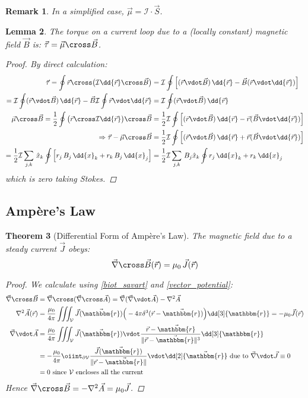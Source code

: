 \documentclass[12pt]{article}
\let\RA\Rightarrow
\renewcommand{\grad}{\vec{\nabla}}
\renewcommand{\div}{\vec{\nabla}\vdot}
\renewcommand{\curl}{\vec{\nabla}\cross}
\newcommand*{\lapl}{\nabla^2}
\newcommand*{\rv}{\vec{r}}
\newcommand*{\ir}{\mathbbm{r}}
\newcommand*{\irv}{\vec{\mathbbm{r}}}
\newcommand*{\vB}{\vec{B}}
\newcommand*{\vJ}{\vec{J}}
\newcommand*{\vA}{\vec{A}}
\newcommand*{\mmu}{\mu_0}
\newcommand*{\vol}{\mathcal{V}}
\newcommand*{\I}{\mathcal{I}}
\newtheorem{theorem}{Theorem}[subsection]
\newtheorem{lemma}[theorem]{Lemma}
\newtheorem{remark}[theorem]{Remark}
\begin{document}
\begin{remark}
  In a simplified case, $\vec{\mu}=\mathcal{I}\cdot\vec{S}$.
\end{remark}

\begin{lemma}
  The torque on a current loop due to a (locally constant) magnetic field $\vec{B}$ is: $\vec{\tau}=\vec{\mu}\cross\vB$.
  \begin{proof}
    By direct calculation: 
    \begin{align*}
      \vec{\tau}=\oint\rv\cross\big(\I\dd{\rv}\cross\vB\big)&=\I\oint\Big[(\rv\vdot\vB)\,\dd{\rv}-\vB(\rv\vdot\dd{\rv})\Big]\\
      =\I\oint(\rv\vdot\vB)\,\dd{\rv}-\vB\I\oint\rv\vdot\dd{\rv}&=\I\oint(\rv\vdot\vB)\,\dd{\rv}\\
      \vec{\mu}\cross\vB=\frac{1}{2}\oint\big(\rv\cross\I\dd{\rv}\big)\cross\vB&=\frac{1}{2}\I\oint\Big[(\rv\vdot\vB)\,\dd{\rv}-\rv(\vB\vdot\dd{\rv})\Big]\\
      \RA\vec{\tau}-\vec{\mu}\cross\vB&=\frac{1}{2}\I\oint\Big[(\rv\vdot\vB)\,\dd{\rv}+\rv(\vB\vdot\dd{\rv})\Big]\\
      =\frac{1}{2}\I\sum_{j,k}\,\hat{x}_k\oint\Big[r_j\,B_j\,\dd{x}_k+r_k\,B_j\,\dd{x}_j\Big]&=\frac{1}{2}\I\sum_{j,k}\,B_j\hat{x}_k\oint r_j\,\dd{x}_k+r_k\,\dd{x}_j
    \end{align*}
    which is zero taking Stokes.
  \end{proof}
\end{lemma}

\pagebreak

\subsection{Ampère's Law}

\begin{theorem}[Differential Form of Ampère's Law]
  \label{ampere_diff}
  The magnetic field due to a steady current $\vJ$ obeys: $$\curl\vB(\rv)=\mmu\,\vJ(\rv)$$
  \begin{proof}
    We calculate using \ref{biot_savart} and \ref{vector_potential}:
    \begin{align*}
      \curl\vB&=\curl(\curl\vA)=\grad(\div\vA)-\lapl\vA\\
      \lapl\vA(\rv)&=\frac{\mmu}{4\pi}\iiint_{\vol}\vJ(\irv)\Big(-4\pi\delta^3(\rv-\irv)\Big)\dd[3]{\ir}=-\mmu\vJ(\rv)\\
      \div\vA&=\frac{\mmu}{4\pi}\iiint_{\vol}\vJ(\irv)\vdot\frac{\rv-\irv}{\|\rv-\irv\|^3}\dd[3]{\ir}\\
      &=-\frac{\mmu}{4\pi}\oiint_{\partial\vol}\frac{\vJ(\irv)}{\|\rv-\irv\|}\vdot\dd[2]{\irv}\text{ due to }\div\vJ\equiv 0\\
      &=0\text{ since }\vol\text{ encloses all the current}
    \end{align*}
    Hence $\curl\vB=-\lapl\vA=\mmu\vJ$.
  \end{proof}
\end{theorem}
\end{document}
